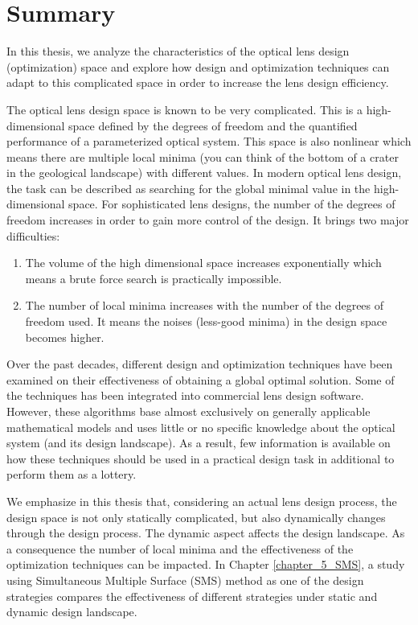 \chapter*{Summary}

In this thesis, we analyze the characteristics of the optical lens design (optimization) space and explore how design and optimization techniques can adapt to this complicated space in order to increase the lens design efficiency. 

The optical lens design space is known to be very complicated. This is a high-dimensional space defined by the degrees of freedom and the quantified performance of a parameterized optical system. This space is also nonlinear which means there are multiple local minima (you can think of the bottom of a crater in the geological landscape) with different values. In modern optical lens design, the task can be described as searching for the global minimal value in the high-dimensional space. For sophisticated lens designs, the number of the degrees of freedom increases in order to gain more control of the design. It brings two major difficulties:  
\begin{enumerate}[nosep]
\item The volume of the high dimensional space increases exponentially which means a brute force search is practically impossible. 
\item The number of local minima increases with the number of the degrees of freedom used. It means the noises (less-good minima) in the design space becomes higher. 
\end{enumerate}

Over the past decades, different design and optimization techniques have been examined on their effectiveness of obtaining a global optimal solution. Some of the techniques has been integrated into commercial lens design software. However, these algorithms base almost exclusively on generally applicable mathematical models and uses little or no specific knowledge about the optical system (and its design landscape). As a result, few information is available on how these techniques should be used in a practical design task in additional to perform them as a lottery. 

We emphasize in this thesis that, considering an actual lens design process, the design space is not only statically complicated, but also dynamically changes through the design process. The dynamic aspect affects the design landscape. As a consequence the number of local minima and the effectiveness of the optimization techniques can be impacted. In Chapter \ref{chapter_5_SMS}, a study using Simultaneous Multiple Surface (SMS) method as one of the design strategies compares the effectiveness of different strategies under static and dynamic design landscape.

